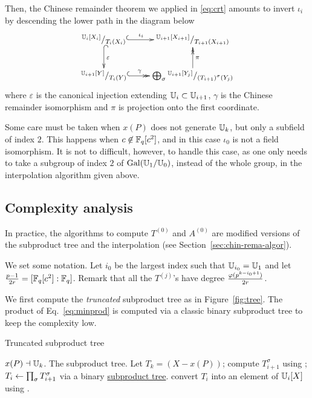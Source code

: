 Then, the Chinese remainder theorem we applied in \eqref{eq:crt}
amounts to invert $\iota_i$ by descending the lower path in the
diagram below
\begin{equation}
  \xymatrix{
    ^{\U_i[X_i]}/_{T_i(X_i)} \ar@{^{(}->}[r]^-{\iota_i} \ar@{^{(}->}[d]^{\varepsilon} &
    ^{\U_{i+1}[X_{i+1}]}/_{T_{i+1}(X_{i+1})} \\
    ^{\U_{i+1}[Y]}/_{T_i(Y)} \ar@{^{(}->>}[r]^-{\gamma} &
    \bigoplus_\sigma {}^{\U_{i+1}[Y_{j}]}/_{\left(T_{i+1}\right)^\sigma(Y_{j})} \ar@{->>}[u]_{\pi}
  }
\end{equation}
where $\varepsilon$ is the canonical injection extending
$\mathbb{U}_i\subset\mathbb{U}_{i+1}$, $\gamma$ is the Chinese remainder isomorphism
and $\pi$ is projection onto the first coordinate.

Some care must be taken when $x(P)$ does not generate $\mathbb{U}_k$, but only
a subfield of index $2$. This happens when $c\not\in\mathbb{F}_q[c^2]$, and in
this case $\iota_0$ is not a field isomorphism. It is not to
difficult, however, to handle this case, as one only needs to take a
subgroup of index $2$ of $\operatorname{Gal}(\mathbb{U}_1/\mathbb{U}_0)$, instead of the whole
group, in the interpolation algorithm given above.


\subsection{Complexity analysis}
\label{sec:C2-AS-FI:complexity}

In practice, the algorithms to compute $T^{(0)}$ and $A^{(0)}$ are
modified versions of the subproduct tree and the interpolation (see
Section~\ref{sec:chin-rema-algor}).

We set some notation. Let $i_0$ be the largest index such that
$\mathbb{U}_{i_0} = \mathbb{U}_1$ and let $\frac{p-1}{2r} = [\mathbb{F}_q[c^2]:\mathbb{F}_q]$.  Remark
that all the $T^{(j)}$'s have degree $\frac{\varphi(p^{k-i_0+1})}{2r}$.

We first compute the \emph{truncated} subproduct tree as in
Figure~\ref{fig:tree}. The product of Eq.~\eqref{eq:minprod} is
computed via a classic binary subproduct tree to keep the complexity
low.

\begin{algorithm}
  \caption{Truncated subproduct tree}
  \begin{algorithmic}[1]
    \REQUIRE $x(P)\dashv\mathbb{U}_k$.
    \ENSURE The subproduct tree.
    \STATE Let $T_k = (X - x(P))$;
    \STATE\label{alg:T:gal} compute $T_{i+1}^\sigma$  using \hyperref[alg:iterfrobenius]{};
    \ENDFOR
    \STATE\label{alg:T:prod}  $T_i\leftarrow\prod_\sigma T_{i+1}^\sigma$ 
    via a binary \hyperref[sec:chin-rema-algor]{subproduct tree}.
    \STATE\label{alg:T:push} convert $T_i$  into an element of
    $\mathbb{U}_i[X]$ using \hyperref[alg:push-down]{}.
    \ENDFOR
  \end{algorithmic}
\end{algorithm}

